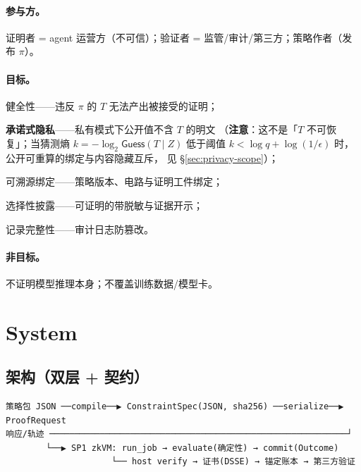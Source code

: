 \documentclass[11pt,a4paper]{article}
\begin{document}
\paragraph{参与方。} 证明者 = agent 运营方（不可信）；验证者 = 监管/审计/第三方；策略作者（发布 $\pi$）。

\paragraph{目标。}
\begin{description}[leftmargin=1.4em,itemsep=2pt]
  \item[(G1)] 健全性——违反 $\pi$ 的 $T$ 无法产出被接受的证明；
  \item[(G2)] \textbf{承诺式隐私}——私有模式下公开值不含 $T$ 的明文
        （\textbf{注意}：这不是「$T$ 不可恢复」；当猜测熵 $k = -\log_2 \mathsf{Guess}(T\mid Z)$
        低于阈值 $k < \log q + \log(1/\epsilon)$ 时，公开可重算的绑定与内容隐藏互斥，
        见 \S\ref{sec:privacy-scope}）；
  \item[(G3)] 可溯源绑定——策略版本、电路与证明工件绑定；
  \item[(G4)] 选择性披露——可证明的带脱敏与证据开示；
  \item[(G5)] 记录完整性——审计日志防篡改。
\end{description}

\paragraph{非目标。} 不证明模型推理本身；不覆盖训练数据/模型卡。

\section{System}
\label{sec:system}

\subsection{架构（双层 + 契约）}
\label{sec:arch}

\begin{Verbatim}[fontsize=\small,frame=single,framesep=4pt]
策略包 JSON ──compile──▶ ConstraintSpec(JSON, sha256) ──serialize──▶ ProofRequest
响应/轨迹 ───────────────────────────────────────────────────────────┘
        └──▶ SP1 zkVM: run_job → evaluate(确定性) → commit(Outcome)
                     └── host verify → 证书(DSSE) → 锚定账本 → 第三方验证
\end{Verbatim}
\end{document}
